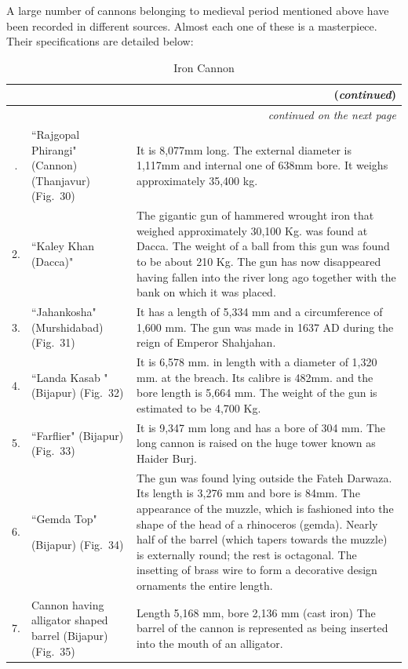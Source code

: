 A large number of cannons belonging to medieval period mentioned above have been recorded in different sources. Almost each one of these is a masterpiece. Their specifications are detailed below:
 {\setcounter{table}{1}
\renewcommand{\thetable}{V.\arabic{table}}
 {\setlength\tabcolsep{2pt}
\begin{longtable}{|c|p{3.5cm}|p{5cm}|}
\caption{Iron Cannon}\label{table V.2}\\
\hline
\endfirsthead
\multicolumn{3}{r}{(\textit{continued})}\\[5pt]
\hline
\endhead
\hline
\multicolumn{3}{r}{\small\itshape continued on the next page}\\
\endfoot
\endlastfoot
1. & ``Rajgopal Phirangi" (Cannon) (Thanjavur) (Fig.~30) & It is 8,077mm long. The external diameter is 1,117mm and internal one of 638mm bore. It weighs approximately 35,400 kg.\\
2. & ``Kaley Khan (Dacca)" & The gigantic gun of hammered wrought iron that weighed approximately 30,100 Kg. was found at Dacca. The weight of a ball from this gun was found to be about 210 Kg. The gun has now disappeared having fallen into the river long ago together with the bank on which it was placed.\\
3. & ``Jahankosha" (Murshidabad) (Fig.~31) & It has a length of 5,334 mm and a circumference of 1,600 mm. The gun was made in 1637 AD during the reign of Emperor Shahjahan.\\
4. & ``Landa Kasab " (Bijapur) (Fig.~32) & It is 6,578 mm. in length with a diameter of 1,320 mm. at the breach. Its calibre is 482mm. and the bore length is 5,664 mm. The weight of the gun is estimated to be 4,700 Kg.\\
5. & ``Farflier" (Bijapur) (Fig.~33) & It is 9,347 mm long and has a bore of 304 mm. The long cannon is raised on the huge tower known as   Haider Burj. \\
6. & ``Gemda Top" \par (Bijapur) (Fig.~34) & The gun was found lying outside the Fateh Darwaza. Its length is 3,276 mm and bore is 84mm.  The appear­ance of the muzzle, which is fashioned into the shape of the head of a rhino­ceros (gemda). Nearly half of the barrel (which tapers towards the muzzle) is externally round; the rest is octagonal. The insetting of brass wire to form a decorative design ornaments the entire length.\\
7. & Cannon having alligator shaped barrel (Bijapur) (Fig.~35) & Length 5,168 mm, bore 2,136 mm (cast iron) The barrel of the cannon is represented as being inserted into the mouth of an alligator. \\

\end{longtable}}}
